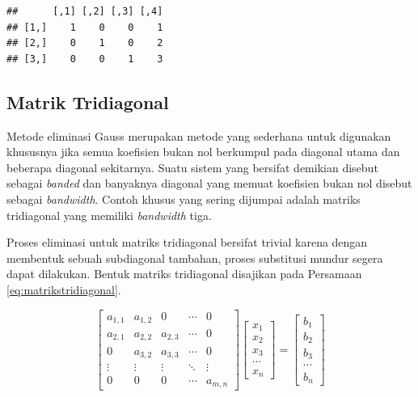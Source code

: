 \documentclass[
]{book}
\theoremstyle{definition}
\theoremstyle{definition}
\theoremstyle{definition}
\theoremstyle{definition}
\theoremstyle{remark}
\begin{document}
\begin{verbatim}
##      [,1] [,2] [,3] [,4]
## [1,]    1    0    0    1
## [2,]    0    1    0    2
## [3,]    0    0    1    3
\end{verbatim}

\hypertarget{matriktridiagonal}{%
\subsection{Matrik Tridiagonal}\label{matriktridiagonal}}

Metode eliminasi Gauss merupakan metode yang sederhana untuk digunakan khususnya jika semua koefisien bukan nol berkumpul pada diagonal utama dan beberapa diagonal sekitarnya. Suatu sistem yang bersifat demikian disebut sebagai \emph{banded} dan banyaknya diagonal yang memuat koefisien bukan nol disebut sebagai \emph{bandwidth}. Contoh khusus yang sering dijumpai adalah matriks tridiagonal yang memiliki \emph{bandwidth} tiga.

Proses eliminasi untuk matriks tridiagonal bersifat trivial karena dengan membentuk sebuah subdiagonal tambahan, proses substitusi mundur segera dapat dilakukan. Bentuk matriks tridiagonal disajikan pada Persamaan \eqref{eq:matrikstridiagonal}.

\begin{equation}
\begin{bmatrix}
     a_{1,1} & a_{1,2} & 0       &\cdots& 0                 \\[0.3em]
     a_{2,1} & a_{2,2} & a_{2,3} &\cdots& 0             \\[0.3em]
     0       & a_{3,2} & a_{3,3} &\cdots& 0             \\[0.3em]
     \vdots  & \vdots  & \vdots  &\ddots& \vdots            \\[0.3em]
     0       & 0       & 0       &\cdots& a_{m,n}
     \end{bmatrix}
\begin{bmatrix}
     x_1                                          \\[0.3em]
     x_2                                          \\[0.3em]
     x_3                                          \\[0.3em]
     \cdots                                       \\[0.3em]
     x_n                                       
     \end{bmatrix}
= \begin{bmatrix}
     b_1                                          \\[0.3em]
     b_2                                          \\[0.3em]
     b_3                                          \\[0.3em]
     \cdots                                       \\[0.3em]
     b_n                                       
     \end{bmatrix}
  \label{eq:matrikstridiagonal}
\end{equation}
\end{document}
